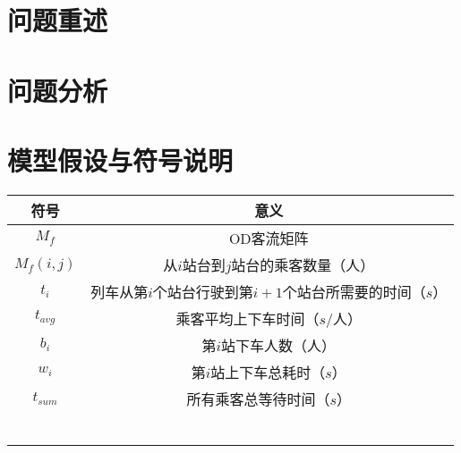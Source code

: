 \setcounter{page}{1}        %

%
%
%

\section{问题重述}

%
%
%

\section{问题分析}

%
%
%

\section{模型假设与符号说明}

\begin{table}[h]
    \centering
    \begin{tabular}{@{}cc@{}}
    \toprule
    符号         & 意义                              \\ \midrule
    $M_f$      & OD客流矩阵                          \\
    $M_f(i,j)$ & 从$i$站台到$j$站台的乘客数量（人）            \\
    $t_i$      & 列车从第$i$个站台行驶到第$i+1$个站台所需要的时间（$s$） \\
    $t_{avg}$  & 乘客平均上下车时间（$s$/人）                  \\
    $b_i$     & 第$i$站下车人数（人）   \\
    $w_i$     & 第$i$站上下车总耗时（$s$） \\
    $t_{sum}$ & 所有乘客总等待时间（$s$）   \\
               &                                 \\
               &                                 \\
               &                                 \\
               &                                 \\
               &                                 \\
               &                                 \\ \bottomrule
    \end{tabular}
\end{table}
